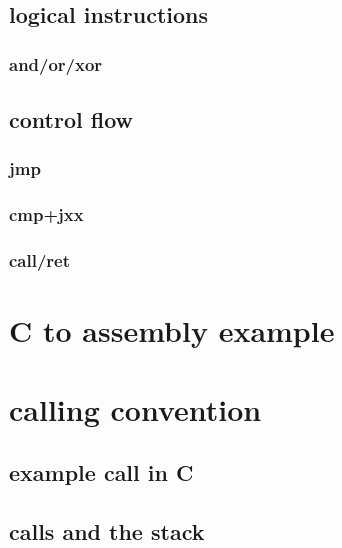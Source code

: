 \subsection{logical instructions}

\subsubsection{and/or/xor}



\subsection{control flow}

\subsubsection{jmp}



\subsubsection{cmp+jxx}



\subsubsection{call/ret}



\section{C to assembly example}



\section{calling convention}

\subsection{example call in C}



\subsection{calls and the stack}


